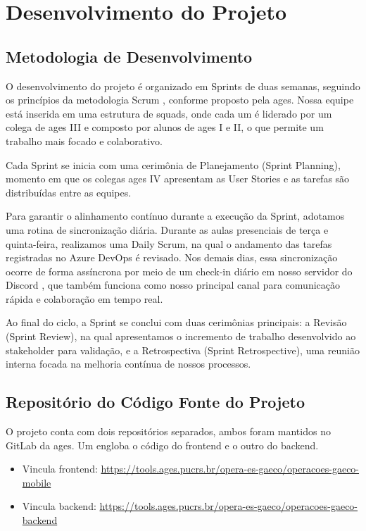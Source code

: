 \section[Desenvolvimento do Projeto]{Desenvolvimento do Projeto}

\subsection{Metodologia de Desenvolvimento}
  O desenvolvimento do projeto é organizado em Sprints de duas semanas, seguindo os princípios da metodologia Scrum \cite{scrum}, conforme proposto pela \acs{ages}. Nossa equipe está inserida em uma estrutura de squads, onde cada um é liderado por um colega de \acs{ages} III e composto por alunos de \acs{ages} I e II, o que permite um trabalho mais focado e colaborativo.

  Cada Sprint se inicia com uma cerimônia de Planejamento (Sprint Planning), momento em que os colegas \acs{ages} IV apresentam as User Stories e as tarefas são distribuídas entre as equipes.

  Para garantir o alinhamento contínuo durante a execução da Sprint, adotamos uma rotina de sincronização diária. Durante as aulas presenciais de terça e quinta-feira, realizamos uma Daily Scrum, na qual o andamento das tarefas registradas no Azure DevOps \cite{azuredevops} é revisado. Nos demais dias, essa sincronização ocorre de forma assíncrona por meio de um check-in diário em nosso servidor do Discord \cite{discord}, que também funciona como nosso principal canal para comunicação rápida e colaboração em tempo real.

  Ao final do ciclo, a Sprint se conclui com duas cerimônias principais: a Revisão (Sprint Review), na qual apresentamos o incremento de trabalho desenvolvido ao stakeholder para validação, e a Retrospectiva (Sprint Retrospective), uma reunião interna focada na melhoria contínua de nossos processos.

\subsection{Repositório do Código Fonte do Projeto}
  O projeto conta com dois repositórios separados, ambos foram mantidos no GitLab da \ac{ages}. Um engloba o código do frontend e o outro do backend.
  
    \begin{itemize}
      \item Vincula frontend: \url{https://tools.ages.pucrs.br/opera-es-gaeco/operacoes-gaeco-mobile}
      \item Vincula backend: \url{https://tools.ages.pucrs.br/opera-es-gaeco/operacoes-gaeco-backend}
    \end{itemize}

